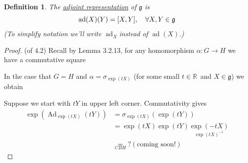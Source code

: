 \documentclass[12pt,a4paper]{article}
\newcommand{\rR}{\ensuremath{\mathbb{R}\,}}
\newcommand{\dgq}[2]{\ensuremath{d {#1}_{#2}}}
\newcommand{\lalg}{\ensuremath{\mathfrak{g}}}
\newcommand{\lall}[1]{\ensuremath{\mathfrak{#1}}}
\newcommand{\ul}[1]{\underline{#1}}
\newcommand{\Adh}[1]{\ensuremath{\operatorname{Ad}_{#1}}}
\newcommand{\ad}{\ensuremath{\operatorname{ad}}}
\newcommand{\adx}{\ensuremath{\operatorname{ad}_X}}
\newtheorem{defn}[thm]{Definition}
\begin{document}
\begin{defn}
The \ul{adjoint representation} of $\lalg$ is 
\[\ad(X)(Y)=\comm{X}{Y}, \quad \forall X,Y\in \lalg\]
(To simplify notation we'll write \adx instead of $\ad(X)$.)
\end{defn}
\begin{proof}(of 4.2)
Recall by Lemma 3.2.13, for any homomorphism $\alpha:G\to H$ we have a commutative square 
\begin{center}
\end{center}
In the case that $G=H$ and $\alpha=\sigma_{\exp(tX)}$ (for some small $t\in \rR$ and $X\in \lalg$) we obtain
\begin{center}
\end{center}
Suppose we start with $tY$ in upper left corner. Commutativity gives
\begin{align*}
\exp(\Adh{\exp(tX)}(tY))&=\sigma_{\exp(tX)}(\exp(tY))\\
&=\exp(tX)\exp(tY)\underset{\exp(tX)^{-1}}{\exp(-tX)}\\
&\underset{CBH}{=}? (\text{coming soon!})
\end{align*}
\end{proof}

  
\end{document}
